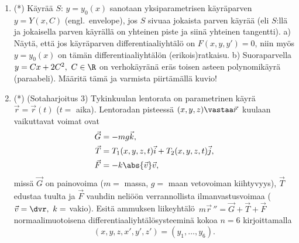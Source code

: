 \begin{enumerate}
\item (*) 
Käyrää $S:\,y=y_0(x)$ sanotaan yksiparametrisen käyräparven $y=Y(x,C)$ 
(engl.\ envelope),
jos $S$ sivuaa jokaista parven käyrää (eli $S$:llä ja jokaisella parven käyrällä on yhteinen
piste ja siinä yhteinen tangentti). \vspace{1mm}\newline
a) Näytä, että jos käyräparven differentiaaliyhtälö on $F(x,y,y')=0$, niin myös $y=y_0(x)$ on
tämän differentiaaliyhtälön (erikois)ratkaisu. \newline
b) Suoraparvella $y=Cx+2C^2,\ C\in\R$ on verhokäyränä eräs toisen asteen polynomikäyrä
(paraabeli). Määritä tämä ja varmista piirtämällä kuvio! 

\item (*) 
(Sotaharjoitus 3) Tykinkuulan lentorata on parametrinen käyrä $\vec r=\vec r(t)$ ($t=$ aika).
Lentoradan pisteessä $(x,y,z) \vastaa \vec r\,$ kuulaan vaikuttavat voimat ovat
\begin{align*}
\vec G &= -mg\vec k, \\
\vec T &= T_1(x,y,z,t)\vec i+T_2(x,y,z,t)\vec j, \\
\vec F &= -k\abs{\vec v}\vec v,
\end{align*}
missä $\vec G$ on painovoima ($m=$ massa, $g=$ maan vetovoiman kiihtyvyys), $\vec T$ edustaa
tuulta ja $\vec F$ vauhdin neliöön verrannollista ilmanvastusvoimaa ($\vec v=\dvr,\ k=$ vakio).
Esitä ammuksen liikeyhtälö $\,m\vec r\,''=\vec G+\vec T+\vec F$ normaalimuotoisena 
differentiaaliyhtälösysteeminä kokoa $n=6$ kirjoittamalla
\[
(x,y,z,x',y',z') = (y_1, \ldots , y_6).
\]

\end{enumerate}